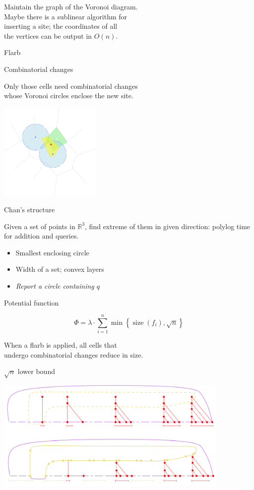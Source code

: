 \documentclass[17pt]{extarticle}
\newcommand{\newslide}[1]{\newpage \begin{center} \large #1 \end{center}}
\DeclareMathOperator{\size}{size}
\begin{document}
Maintain the graph of the Voronoi diagram. \\
Maybe there is a sublinear algorithm for \\
inserting a site; the coordinates of all \\
the vertices can be output in \(O(n)\).

\newslide{Flarb}

\newslide{Combinatorial changes} \vspace{-7mm}

Only those cells need combinatorial changes \\
whose Voronoi circles enclose the new site.

\begin{center}
	\includegraphics[height=4.7cm]{figs/identChanges-dark}
\end{center}

\newslide{Chan's structure} \vspace{-5mm}

Given a set of points in \( \mathbb R^3 \), find extreme of them in given direction: polylog time for addition and queries.

\begin{itemize}
	\item Smallest enclosing circle
	\item Width of a set; convex layers
	\item {\it Report a circle containing \(q\)}
\end{itemize}

\newslide{Potential function}
\[ Φ = λ \cdot \sum\limits_{i=1}^n
   \min\left\{
      \size(f_i), \sqrt{n}
   \right\}\]

When a flarb is applied, all cells that \\
undergo combinatorial changes reduce in size.

\newslide{\(\sqrt{n}\) lower bound}

\begin{center}
	\includegraphics[width=0.85\textwidth]{figs/sqrtn}
\end{center}
\end{document}
